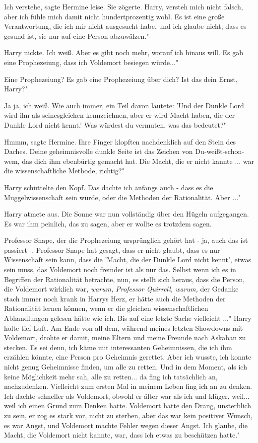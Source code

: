 \glqq{}Ich verstehe\grqq{}, sagte Hermine leise. Sie zögerte. \glqq{}Harry,
versteh mich nicht falsch, aber ich fühle mich damit nicht hundertprozentig
wohl. Es ist eine große Verantwortung, die ich mir nicht ausgesucht habe, und
ich glaube nicht, dass es gesund ist, sie nur auf eine Person abzuwälzen."

Harry nickte. \glqq{}Ich weiß. Aber es gibt noch mehr, worauf ich hinaus will. Es
gab eine Prophezeiung, dass ich Voldemort besiegen würde..."

\glqq{}Eine Prophezeiung? Es gab eine Prophezeiung über dich? Ist das dein Ernst,
Harry?"

\glqq{}Ja ja, ich weiß. Wie auch immer, ein Teil davon lautete: 'Und der Dunkle
Lord wird ihn als seinesgleichen kennzeichnen, aber er wird Macht haben, die der
Dunkle Lord nicht kennt.' Was würdest du vermuten, was das bedeutet?"

\glqq{}Hmmm\grqq{}, sagte Hermine. Ihre Finger klopften nachdenklich auf den
Stein des Daches. \glqq{}Deine geheimnisvolle dunkle Seite ist das Zeichen von
Du-weißt-schon-wem, das dich ihm ebenbürtig gemacht hat. Die Macht, die er nicht
kannte ... war die wissenschaftliche Methode, richtig?"

Harry schüttelte den Kopf. \glqq{}Das dachte ich anfangs auch - dass es die
Muggelwissenschaft sein würde, oder die Methoden der Rationalität. Aber ..."

Harry atmete aus. Die Sonne war nun vollständig über den Hügeln aufgegangen. Es
war ihm peinlich, das zu sagen, aber er wollte es trotzdem sagen.

\glqq{}Professor Snape, der die Prophezeiung ursprünglich gehört hat - ja, auch
das ist passiert -, Professor Snape hat gesagt, dass er nicht glaubt, dass es
nur Wissenschaft sein kann, dass die 'Macht, die der Dunkle Lord nicht kennt',
etwas sein muss, das Voldemort noch fremder ist als nur das. Selbst wenn ich es
in Begriffen der Rationalität betrachte, nun, es stellt sich heraus, dass die
Person, die Voldemort wirklich war\grqq{}, \emph{warum, Professor Quirrell,
warum,} der Gedanke stach immer noch krank in Harrys Herz, \glqq{}er hätte auch
die Methoden der Rationalität lernen können, wenn er die gleichen
wissenschaftlichen Abhandlungen gelesen hätte wie ich. Bis auf eine letzte Sache
vielleicht ..." Harry holte tief Luft. \glqq{}Am Ende von all dem, während meines
letzten Showdowns mit Voldemort, drohte er damit, meine Eltern und meine Freunde
nach Askaban zu stecken. Es sei denn, ich käme mit interessanten Geheimnissen,
die ich ihm erzählen könnte, eine Person pro Geheimnis gerettet. Aber ich
wusste, ich konnte nicht genug Geheimnisse finden, um alle zu retten. Und in dem
Moment, als ich keine Möglichkeit mehr sah, alle zu retten... da fing ich
tatsächlich an, nachzudenken. Vielleicht zum ersten Mal in meinem Leben fing ich
an zu denken. Ich dachte schneller als Voldemort, obwohl er älter war als ich
und klüger, weil... weil ich einen Grund zum Denken hatte. Voldemort hatte den
Drang, unsterblich zu sein, er zog es stark vor, nicht zu sterben, aber das war
kein positiver Wunsch, es war Angst, und Voldemort machte Fehler wegen dieser
Angst. Ich glaube, die Macht, die Voldemort nicht kannte, war, dass ich etwas zu
beschützen hatte."

